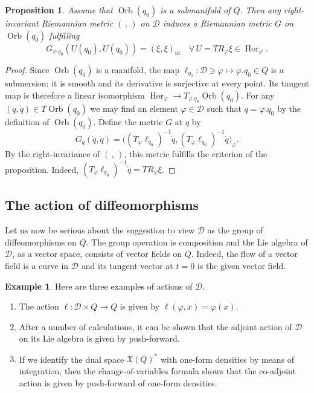 \documentclass[a5paper,10pt,twoside]{article}
\newcommand{\cD}{\ensuremath{\mathcal{D}}}
\DeclareMathOperator*{\Orb}{Orb}
\DeclareMathOperator*{\Hor}{Hor}
\DeclareMathOperator*{\id}{id}
\theoremstyle{plain}
\newtheorem{prop}[teo]{Proposition}
\theoremstyle{definition}
\newtheorem{exam}[teo]{Example}
\theoremstyle{remark}
\begin{document}
\begin{prop}
Assume that $\Orb(q_0)$ is a submanifold of $Q.$ Then any right-invariant Riemannian metric $(\, ,\,)$ on $\cD$ induces a Riemannian metric $G$ on $\Orb(q_0)$ fulfilling
\[
G_{\varphi.q_0}(U(q_0),U(q_0)) = ( \xi,\xi)_{\id}\quad \forall\, U=TR_\varphi \xi \in{\Hor}_\varphi.
\]
\end{prop}

\begin{proof}
Since $\Orb(q_0)$ is a manifold, the map $\ell_{q_0}:\cD\ni\varphi\mapsto \varphi.q_0\in Q$ is a submersion; it is smooth and its derivative is surjective at every point. Its tangent map is therefore a linear isomorphism $\Hor_\varphi\to T_{\varphi.q_0}\Orb(q_0)$. For any $(q,\dot{q})\in T\Orb(q_0)$ we may find an element $\varphi\in\cD$ such that $q=\varphi.q_0$ by the definition of $\Orb(q_0)$. Define the metric $G$ at $q$ by 
%
\begin{equation}
G_q(\dot{q},\dot{q})=\big( (T_\varphi \ell_{q_0})^{-1}\dot{q},(T_\varphi \ell_{q_0})^{-1}\dot{q}\big)_\varphi.
\end{equation}
%
By the right-invariance of $(\, ,\,)$, this metric fulfills the criterion of the proposition. Indeed, $(T_\varphi \ell_{q_0})^{-1}\dot{q}=TR_\varphi\xi$.
\end{proof}


\subsection{The action of diffeomorphisms}
Let us now be serious about the suggestion to view $\cD$ as the group of diffeomorphisms on $Q$. The group operation is composition and the Lie algebra of $\cD$, as a vector space, consists of vector fields on $Q$. Indeed, the flow of a vector field is a curve in $\cD$ and its tangent vector at $t=0$ is the given vector field.

\begin{exam}
Here are three examples of actions of $\cD$.
\begin{enumerate}
	\item The action $\ell:\cD\times Q\to Q$ is given by $\ell(\varphi,x)=\varphi(x)$.
	\item After a number of calculations, it can be shown that the adjoint action of $\cD$ on its Lie algebra is given by push-forward.
	\item If we identify the dual space $\mathfrak{X}(Q)^*$ with one-form densities by means of integration, then the change-of-variables formula shows that the co-adjoint action is given by push-forward of one-form densities.
\end{enumerate}
\end{exam}
\end{document}
